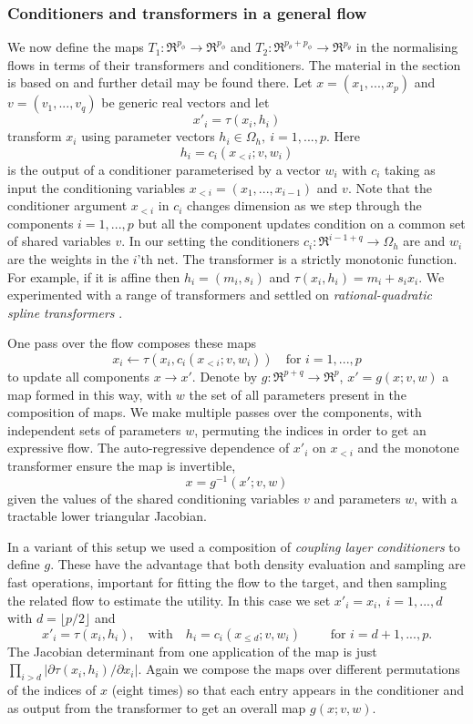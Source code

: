 \subsubsection{Conditioners and transformers in a general flow}
We now define the maps $T_1: \Re^{p_\phi}\to \Re^{p_\phi}$ and $T_2: \Re^{p_\theta+p_\phi}\to \Re^{p_\theta}$ in the normalising flows in terms of their transformers and conditioners. The material in the section is based on \cite{Papamakarios2021normalizing} and further detail may be found there.
Let $x=(x_1,...,x_p)$ and $v=(v_1,...,v_q)$ be generic real vectors and let \[x'_i=\tau(x_i,h_i)\] transform $x_i$ using parameter vectors $h_i\in \Omega_h,\ i=1,...,p$. Here \[h_i=c_i(x_{<i};v,w_i)\] is the output of a conditioner parameterised by a vector $w_i$ with $c_i$ taking as input the conditioning variables $x_{<i}=(x_1,...,x_{i-1})$ and $v$. Note that the conditioner argument $x_{<i}$ in $c_i$ changes dimension as we step through the components $i=1,...,p$ but all the component updates condition on a common set of shared variables $v$. In our setting the conditioners $c_i: \Re^{i-1+q}\to \Omega_h$ are  and $w_i$ are the weights in the $i$'th net. The transformer is a strictly monotonic function. For example, if it is affine then $h_i=(m_i,s_i)$ and $\tau(x_i,h_i)=m_i+s_ix_i$. We experimented with a range of transformers and settled on \emph{rational-quadratic spline transformers} \citep{Durkan2019neural}.
 
One pass over the flow composes these maps 
\[x_i\leftarrow \tau(x_i,c_i(x_{<i};v,w_i)) \quad \mbox{for $i=1,...,p$}\] to update all components $x\to x'$.
Denote by $g: \Re^{p+q}\to \Re^p$, $x'=g(x;v,w)$ a map formed in this way, with $w$ the set of all parameters present in the composition of maps. We make multiple passes over the components, with independent sets of parameters $w$, permuting the indices in order to get an expressive flow. The auto-regressive dependence of $x'_i$ on $x_{<i}$ and the monotone transformer ensure the map is invertible, \[x=g^{-1}(x';v,w)\] given the values of the shared conditioning variables $v$ and parameters $w$, with a tractable lower triangular Jacobian.

In a variant of this setup we used a composition of \emph{coupling layer conditioners} \citep{Dinh2016realnvp} to define $g$. These have the advantage that both density evaluation and sampling are fast operations, important for fitting the flow to the target, and then sampling the related flow to estimate the utility. In this case we set $x'_i=x_i,\ i=1,...,d$ with $d=\lfloor p/2\rfloor$ and
\[x'_i=\tau(x_i,h_i),\quad\mbox{with}\quad h_i=c_i(x_{\le d};v,w_i)\qquad \mbox{ for $i=d+1,...,p$.}\]
The Jacobian determinant from one application of the map is just $\prod_{i>d} |\partial \tau(x_i,h_i)/\partial x_i|$. Again we compose the maps over different permutations of the indices of $x$ (eight times) so that each entry appears in the conditioner and as output from the transformer to get an overall map $g(x;v,w)$.

